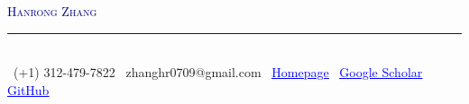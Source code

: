 \documentclass[letterpaper,11pt]{article}
\begin{document}

\begin{center}
    {\Huge \scshape \textcolor{navy}{Hanrong Zhang}} \\ \vspace{2pt}
    {\color{teal}\rule{0.42\textwidth}{0.6pt}} \\ \vspace{4pt}
    {\small\color{muted}\faPhone\, (+1) 312-479-7822 \quad
    \faEnvelope\, {zhanghr0709@gmail.com} \quad
    \faGlobe\, \href{https://zhang-henry.github.io}{\textcolor{blue}{\underline{Homepage}}} \quad
    \faGraduationCap\, \href{https://scholar.google.com/citations?user=qG5_O40AAAAJ&hl=zh-CN}{\textcolor{blue}{\underline{Google Scholar}}} \quad
    \faGithub\, \href{https://github.com/Zhang-Henry}{\textcolor{blue}{\underline{GitHub}}}}

\end{center}



\end{document}

